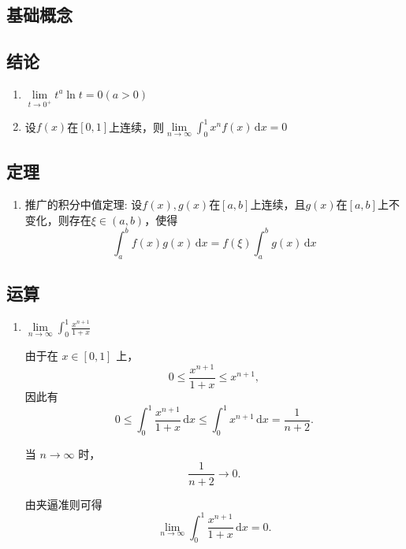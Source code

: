 \documentclass[a4paper,12pt]{article}
\begin{document}
    \subsection{基础概念}

    \begin{enumerate}
    \end{enumerate}

    \subsection{结论}

    \begin{enumerate}
        \item $\lim\limits_{t\to 0^+} t^a\ln t = 0(a > 0)$
        \item 设$f(x)$在$[0, 1]$上连续，则$\lim\limits_{n\to \infty} \displaystyle\int_0^1 x^{n}f(x)\,\mathrm{d}x = 0$
    \end{enumerate}

    \subsection{定理}

    \begin{enumerate}
        \item 推广的积分中值定理: 设$f(x), g(x)$在$[a, b]$上连续，且$g(x)$在$[a, b]$上不变化，则存在$\xi \in (a, b)$，使得
        \[
            \int_a^b f(x)g(x)\,\mathrm{d}x = f(\xi)\int_a^b g(x)\,\mathrm{d}x
        \]
    \end{enumerate}

    \subsection{运算}

    \begin{enumerate}
        \item $\lim\limits_{n\to\infty} \displaystyle\int_0^1 \frac{x^{n+1}}{1+x}$
        \begin{analysisbox}
            由于在 $x\in[0,1]$ 上，
            \[
                0 \le \frac{x^{n+1}}{1+x} \le x^{n+1},
            \]
            因此有
            \[
                0 \le \int_0^1 \frac{x^{n+1}}{1+x}\,\mathrm{d}x
                \le \int_0^1 x^{n+1}\,\mathrm{d}x
                = \frac{1}{n+2}.
            \]

            当 $n\to\infty$ 时，
            \[
                \frac{1}{n+2} \to 0.
            \]

            由夹逼准则可得
            \[
                \lim_{n\to\infty}\int_0^1 \frac{x^{n+1}}{1+x}\,\mathrm{d}x
                = 0.
            \]
        \end{analysisbox}
    \end{enumerate}
\end{document}
